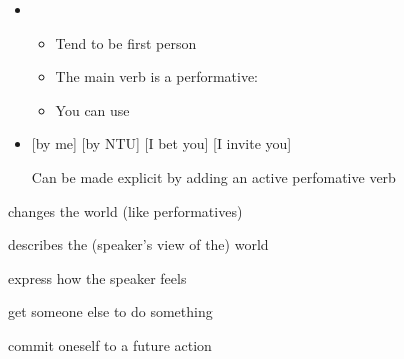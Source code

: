 \documentclass[a4paper,landscape,headrule,footrule,xetex]{foils}
\begin{document}
\begin{itemize}
\item {}
  \begin{itemize}
  \item Tend to be first person
  \item The main verb  is a performative: 
  \item You can use 
  \end{itemize}
\item {}
  \begin{exe}
    \ex {} [by me]
    \ex {} [by NTU]
    \ex {} [I bet you] 
    \ex {} [I invite you]
  \end{exe}
  Can be made explicit by adding an active perfomative verb
\end{itemize}


  \begin{description}
  \item {} changes the world (like performatives)
  \item {} describes the (speaker's view of the) world 
  \item {}  express how the speaker feels
  \item {} get someone else to do something
  \item {} commit oneself to a future action
  \end{description}
\end{document}
